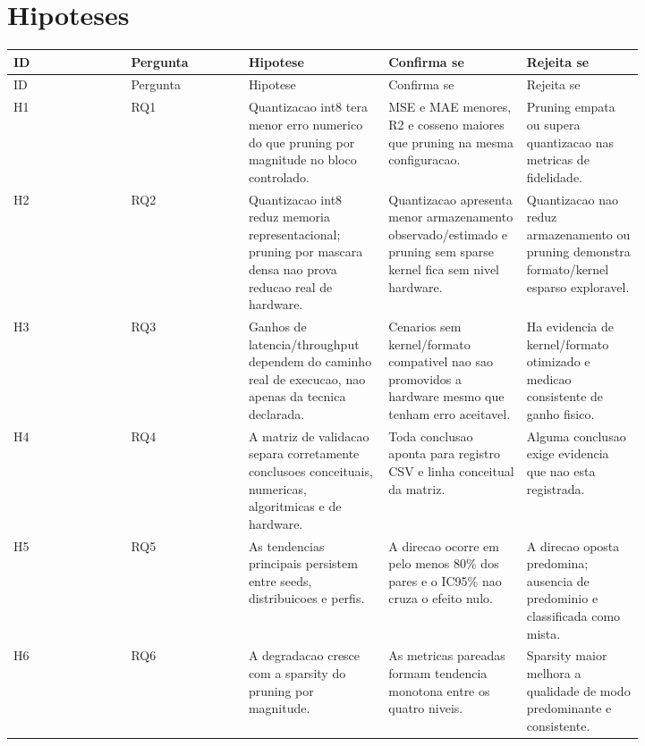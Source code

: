 \section{Hipoteses}



\begin{landscape}
\scriptsize
\begin{longtable}{@{}>{\RaggedRight\arraybackslash}p{0.164\linewidth}>{\RaggedRight\arraybackslash}p{0.164\linewidth}>{\RaggedRight\arraybackslash}p{0.164\linewidth}>{\RaggedRight\arraybackslash}p{0.164\linewidth}>{\RaggedRight\arraybackslash}p{0.164\linewidth}@{}}
\toprule
ID & Pergunta & Hipotese & Confirma se & Rejeita se \\
\midrule
\endfirsthead
\toprule
ID & Pergunta & Hipotese & Confirma se & Rejeita se \\
\midrule
\endhead
H1 & RQ1 & Quantizacao int8 tera menor erro numerico do que pruning por magnitude no bloco controlado. & MSE e MAE menores, R2 e cosseno maiores que pruning na mesma configuracao. & Pruning empata ou supera quantizacao nas metricas de fidelidade. \\
H2 & RQ2 & Quantizacao int8 reduz memoria representacional; pruning por mascara densa nao prova reducao real de hardware. & Quantizacao apresenta menor armazenamento observado/estimado e pruning sem sparse kernel fica sem nivel hardware. & Quantizacao nao reduz armazenamento ou pruning demonstra formato/kernel esparso exploravel. \\
H3 & RQ3 & Ganhos de latencia/throughput dependem do caminho real de execucao, nao apenas da tecnica declarada. & Cenarios sem kernel/formato compativel nao sao promovidos a hardware mesmo que tenham erro aceitavel. & Ha evidencia de kernel/formato otimizado e medicao consistente de ganho fisico. \\
H4 & RQ4 & A matriz de validacao separa corretamente conclusoes conceituais, numericas, algoritmicas e de hardware. & Toda conclusao aponta para registro CSV e linha conceitual da matriz. & Alguma conclusao exige evidencia que nao esta registrada. \\
H5 & RQ5 & As tendencias principais persistem entre seeds, distribuicoes e perfis. & A direcao ocorre em pelo menos 80\% dos pares e o IC95\% nao cruza o efeito nulo. & A direcao oposta predomina; ausencia de predominio e classificada como mista. \\
H6 & RQ6 & A degradacao cresce com a sparsity do pruning por magnitude. & As metricas pareadas formam tendencia monotona entre os quatro niveis. & Sparsity maior melhora a qualidade de modo predominante e consistente. \\

\end{longtable}
\end{landscape}
